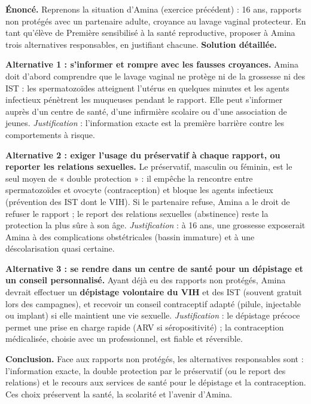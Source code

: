 \documentclass[11pt]{article}
\begin{document}
\begin{exoresolu}
\textbf{Énoncé.} Reprenons la situation d'Amina (exercice précédent) : 16 ans, rapports non protégés avec un partenaire adulte, croyance au lavage vaginal protecteur. En tant qu'élève de Première sensibilisé à la santé reproductive, proposer à Amina trois alternatives responsables, en justifiant chacune.
\tcblower
\textbf{Solution détaillée.}

\textbf{Alternative 1 : s'informer et rompre avec les fausses croyances.} Amina doit d'abord comprendre que le lavage vaginal ne protège ni de la grossesse ni des IST : les spermatozoïdes atteignent l'utérus en quelques minutes et les agents infectieux pénètrent les muqueuses pendant le rapport. Elle peut s'informer auprès d'un centre de santé, d'une infirmière scolaire ou d'une association de jeunes. \emph{Justification} : l'information exacte est la première barrière contre les comportements à risque.

\textbf{Alternative 2 : exiger l'usage du préservatif à chaque rapport, ou reporter les relations sexuelles.} Le préservatif, masculin ou féminin, est le seul moyen de « double protection » : il empêche la rencontre entre spermatozoïdes et ovocyte (contraception) et bloque les agents infectieux (prévention des IST dont le VIH). Si le partenaire refuse, Amina a le droit de refuser le rapport ; le report des relations sexuelles (abstinence) reste la protection la plus sûre à son âge. \emph{Justification} : à 16 ans, une grossesse exposerait Amina à des complications obstétricales (bassin immature) et à une déscolarisation quasi certaine.

\textbf{Alternative 3 : se rendre dans un centre de santé pour un dépistage et un conseil personnalisé.} Ayant déjà eu des rapports non protégés, Amina devrait effectuer un \textbf{dépistage volontaire du VIH} et des IST (souvent gratuit lors des campagnes), et recevoir un conseil contraceptif adapté (pilule, injectable ou implant) si elle maintient une vie sexuelle. \emph{Justification} : le dépistage précoce permet une prise en charge rapide (ARV si séropositivité) ; la contraception médicalisée, choisie avec un professionnel, est fiable et réversible.

\textbf{Conclusion.} Face aux rapports non protégés, les alternatives responsables sont : l'information exacte, la double protection par le préservatif (ou le report des relations) et le recours aux services de santé pour le dépistage et la contraception. Ces choix préservent la santé, la scolarité et l'avenir d'Amina.
\end{exoresolu}
\end{document}
